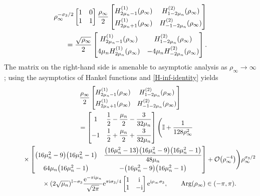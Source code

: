 \documentclass[pdftex]{sigma}
\numberwithin{equation}{section}
\newcommand{\ee}{\mathrm{e}}
\newcommand{\ii}{\mathrm{i}}
\renewcommand{\arg}{\operatorname{Arg}}
\begin{document}
\begin{gather}
 \rho_\infty^{-\sigma_3/2} \begin{bmatrix} 1 & 0 \\ 1 & 1\end{bmatrix} \dfrac{\rho_\infty}{2} \begin{bmatrix}H_{2\mu_n - 1}^{(1)}(\rho_\infty) & H_{1 -2\mu_n}^{(2)}(\rho_\infty) \vspace{1mm}\\ H^{(1)}_{2\mu_n + 1}(\rho_\infty) & H_{-1 -2\mu_n}^{(2)}(\rho_\infty) \end{bmatrix}\nonumber\\
 \qquad= \dfrac{\sqrt{\rho_\infty}}{2} \begin{bmatrix} H_{2\mu_n-1}^{(1)}(\rho_\infty) & H_{1-2\mu_n}^{(2)}(\rho_\infty)\vspace{1mm}\\4\mu_n H_{2\mu_n}^{(1)}(\rho_\infty) & -4\mu_n H_{-2\mu_n}^{(2)}(\rho_\infty)\end{bmatrix}.\label{H-inf-identity}
\end{gather}
The matrix on the right-hand side is amenable to asymptotic analysis as $\rho_\infty \to \infty$; using the asymptotics of Hankel functions \cite[equations~(10.17.5) and (10.17.6)]{DLMF} and \eqref{H-inf-identity} yields
\begin{gather}
 \dfrac{\rho_\infty}{2} \begin{bmatrix}H_{2\mu_n - 1}^{(1)}(\rho_\infty) & H_{1 -2\mu_n}^{(2)}(\rho_\infty) \vspace{1mm}\\ H^{(1)}_{2\mu_n + 1}(\rho_\infty) & H_{-1 -2\mu_n}^{(2)}(\rho_\infty) \end{bmatrix}\nonumber\\
 \qquad= \begin{bmatrix} 1 & \dfrac{1}{2}-\dfrac{\mu_n}{2}-\dfrac{3}{32 \mu_n} \vspace{1mm}\\ -1 & \dfrac{1}{2} + \dfrac{\mu_n}{2}+\dfrac{3}{32 \mu_n}
\end{bmatrix} \Biggl( \mathbb{I}+ \dfrac{1}{128 \rho_\infty^2}  \nonumber\\
 \phantom{\qquad=}{}\times \begin{bmatrix} \big(16\mu_n^2 - 9\big)\big(16\mu_n^2 - 1\big) & \dfrac{\big(16 \mu_n^2 - 13\big)\big(16\mu_n^2 - 9\big)\big(16\mu_n^2 - 1\big)}{48\mu_n} \vspace{1mm}\\ 64\mu_n\big(16\mu_n^2 - 1\big) & - \big(16\mu_n^2 - 9\big)\big(16\mu_n^2 - 1\big)\end{bmatrix} + \mathcal{O}\big(\rho_\infty^{-4}\big)\Biggr) \rho_\infty^{\sigma_3/2} \nonumber\\
\phantom{\qquad=}{}\times (2\sqrt{\mu_n})^{\mathbb{I}-\sigma_3}{\dfrac{\ee^{-\pi \ii \mu_n}}{\sqrt{2\pi}}} {}{} \ee^{\pi \ii\sigma_3/4}\begin{bmatrix} 1 & \ii\\ 1 &-\ii \end{bmatrix} \ee^{\ii \rho_\infty \sigma_3}, \qquad \arg(\rho_\infty) \in (-\pi, \pi).\label{h-infty-asymptotics}
\end{gather}
\end{document}
